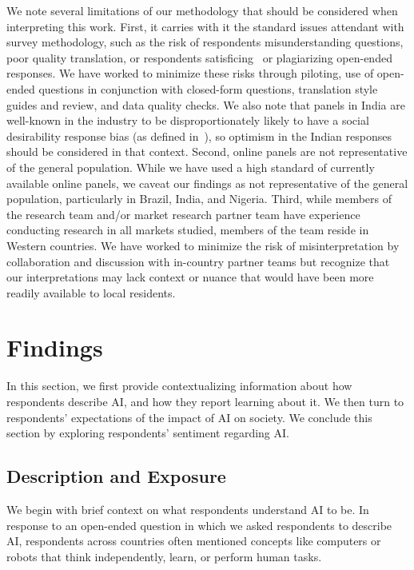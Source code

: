 \documentclass[sigconf]{acmart}
\newcommand\q[1]{\textcolor{Mahogany}{\small{\textbf{}}}}
\begin{document}
We note several limitations of our methodology that should be considered when interpreting this work. First, it carries with it the standard issues attendant with survey methodology, such as the risk of respondents misunderstanding questions, poor quality translation, or respondents satisficing~\cite{holbrook2003telephone} or plagiarizing open-ended responses. We have worked to minimize these risks through piloting, use of open-ended questions in conjunction with closed-form questions, translation style guides and review, and data quality checks. We also note that panels in India are well-known in the industry to be disproportionately likely to have a social desirability response bias (as defined in~\cite{holbrook2003telephone}), so optimism in the Indian responses should be considered in that context. Second, online panels are not representative of the general population. While we have used a high standard of currently available online panels, we caveat our findings as not representative of the general population, particularly in Brazil, India, and Nigeria. Third, while members of the research team and/or market research partner team have experience conducting research in all markets studied, members of the team reside in Western countries. We have worked to minimize the risk of misinterpretation by collaboration and discussion with in-country partner teams but recognize that our interpretations may lack context or nuance that would have been more readily available to local residents. 
 


\section{Findings}

In this section, we first provide contextualizing information about how respondents describe AI, and how they report learning about it. We then turn to respondents' expectations of the impact of AI on society. We conclude this section by exploring respondents' sentiment regarding AI.





    
\subsection{Description and Exposure}

We begin with brief context on what respondents understand AI to be. In response to an open-ended question in which we asked respondents to describe AI, respondents across countries often mentioned concepts like computers or robots that think independently, learn, or perform human tasks.~\q{U1-U4}
\end{document}
